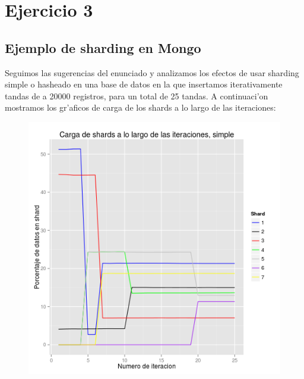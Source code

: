 \section{Ejercicio 3}

\subsection{Ejemplo de sharding en Mongo}

Seguimos las sugerencias del enunciado y analizamos los efectos de usar sharding simple o hasheado en una base de datos en la que insertamos iterativamente tandas de a 20000 registros, para un total de 25 tandas. A continuaci'on mostramos los gr'aficos de carga de los shards a lo largo de las iteraciones:

\begin{figure}[H]
	\begin{center}
		\includegraphics[scale=0.6]{imagenes/siete_shards_simple.png}
	\end{center}
\end{figure}

